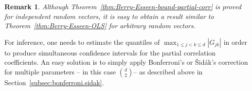 \documentclass[11pt]{article}
\newtheorem{remark}[theorem]{Remark}
\begin{document}
\begin{remark}
Although Theorem~\ref{thm:Berry-Esseen-bound-partial-corr} is proved for independent random vectors, it is easy to obtain a result similar to Theorem~\ref{thm:Berry-Esseen-OLS} for arbitrary random vectors. %
\end{remark}

For inference, one needs to estimate the quantiles of $\max_{1\le j < k\le d}|G_{jk}|$ in order to produce simultaneous confidence intervals for the partial correlation coefficients. An easy solution is to simply apply Bonferroni's or {\v{S}}id{\'a}k's correction for multiple parameters -- in this case ${d \choose 2} $--  as described above in Section~\ref{subsec:bonferroni.sidak}.
\end{document}
